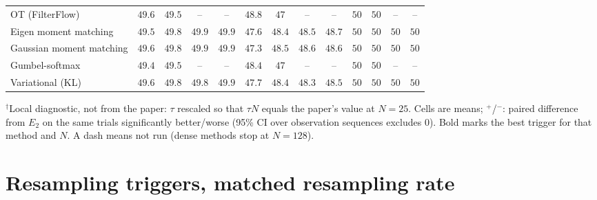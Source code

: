 \begin{table}[ht]
\begin{adjustbox}{max width=\linewidth}
\begin{tabular}{lcccc|cccc|cccc}
OT (FilterFlow) & $49.6$ & $49.5$ & -- & -- & $48.8$ & $47$ & -- & -- & $50$ & $50$ & -- & -- \\
Eigen moment matching & $49.5$ & $49.8$ & $49.9$ & $49.9$ & $47.6$ & $48.4$ & $48.5$ & $48.7$ & $50$ & $50$ & $50$ & $50$ \\
Gaussian moment matching & $49.6$ & $49.8$ & $49.9$ & $49.9$ & $47.3$ & $48.5$ & $48.6$ & $48.6$ & $50$ & $50$ & $50$ & $50$ \\
Gumbel-softmax & $49.4$ & $49.5$ & -- & -- & $48.4$ & $47$ & -- & -- & $50$ & $50$ & -- & -- \\
Variational (KL) & $49.6$ & $49.8$ & $49.8$ & $49.9$ & $47.7$ & $48.4$ & $48.3$ & $48.5$ & $50$ & $50$ & $50$ & $50$ \\
\bottomrule
\end{tabular}
\end{adjustbox}
\par\smallskip\parbox{0.95\linewidth}{\footnotesize $^\dagger$Local diagnostic, not from the paper: $\tau$ rescaled so that $\tau N$ equals the paper's value at $N{=}25$. Cells are means; $^{+}$/$^{-}$: paired difference from $E_2$ on the same trials significantly better/worse (95\% CI over observation sequences excludes 0). Bold marks the best trigger for that method and $N$. A dash means not run (dense methods stop at $N{=}128$).}
\end{table}

\clearpage
\section*{Resampling triggers, matched resampling rate}

